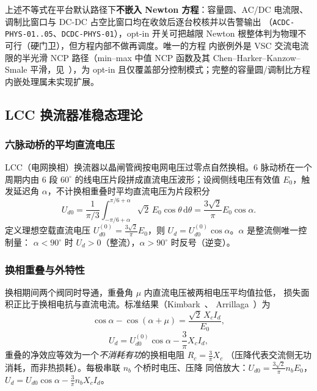 \begin{gapnote}
上述不等式在平台默认路径下\textbf{不嵌入 Newton 方程}：容量圆、AC/DC 电流限、
调制比窗口与 DC-DC 占空比窗口均在收敛后逐台校核并以告警输出
（\texttt{ACDC-PHYS-01..05}、\texttt{DCDC-PHYS-01}），opt-in 开关可把越限
Newton 根整体判为物理不可行（硬门卫），但方程内部不做再调度。唯一的方程
内嵌例外是 VSC 交流电流限的半光滑 NCP 路径（min--max 中值 NCP 函数及其
Chen--Harker--Kanzow--Smale 平滑，见~\cite{pfvs:facchinei}），为 opt-in
且仅覆盖部分控制模式；完整的容量圆/调制比方程内嵌处理属未实现扩展。
\end{gapnote}

\subsection{LCC 换流器准稳态理论}\label{sec:pf-th-vs-lcc}

\subsubsection{六脉动桥的平均直流电压}
LCC（电网换相）换流器以晶闸管阀按电网电压过零点自然换相。6 脉动桥在一个
周期内由 6 段 $60^{\circ}$ 的线电压片段拼成直流电压波形；设阀侧线电压有效值
$E_0$，触发延迟角 $\alpha$，不计换相重叠时平均直流电压为片段积分
\begin{equation}
U_{d0}=\frac{1}{\pi/3}\int_{-\pi/6+\alpha}^{\pi/6+\alpha}\sqrt2\,E_0\cos\theta\,
\mathrm{d}\theta
=\frac{3\sqrt2}{\pi}E_0\cos\alpha.
\end{equation}
定义理想空载直流电压 $U_{d0}^{(0)}=\tfrac{3\sqrt2}{\pi}E_0$，则
$U_d=U_{d0}^{(0)}\cos\alpha$。$\alpha$ 是整流侧唯一控制量：
$\alpha<90^{\circ}$ 时 $U_d>0$（整流），$\alpha>90^{\circ}$ 时反号（逆变）。

\subsubsection{换相重叠与外特性}
换相期间两个阀同时导通，重叠角 $\mu$ 内直流电压被两相电压平均值拉低，
损失面积正比于换相电抗与直流电流。标准结果（Kimbark~\cite{pfvs:kimbark}、
Arrillaga~\cite{pfvs:arrillaga}）为
\begin{equation}
\cos\alpha-\cos(\alpha+\mu)=\frac{\sqrt2\,X_c I_d}{E_0},
\end{equation}
\begin{equation}
U_d=U_{d0}^{(0)}\cos\alpha-\frac{3}{\pi}X_c I_d,
\end{equation}
重叠的净效应等效为一个\emph{不消耗有功}的换相电阻 $R_c=\tfrac{3}{\pi}X_c$
（压降代表交流侧无功消耗，而非热损耗）。每极串联 $n_b$ 个桥时电压、压降
同倍放大：$U_{d0}=\tfrac{3\sqrt2}{\pi}n_bE_0$，$U_d=U_{d0}\cos\alpha-
\tfrac{3}{\pi}n_bX_cI_d$。

